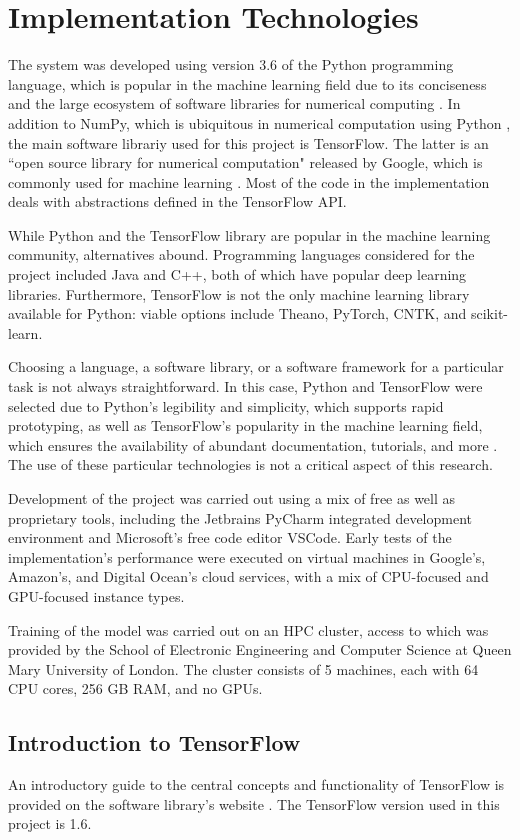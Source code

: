\documentclass[12pt, titlepage]{report}
\theoremstyle{definition}
\begin{document}
\section{Implementation Technologies}
The system was developed using version 3.6 of the Python programming language, which is popular in the machine learning field due to its conciseness and the large ecosystem of software libraries for numerical computing \cite{numpy}. In addition to NumPy, which is ubiquitous in numerical computation using Python \cite{numpy}, the main software librariy used for this project is TensorFlow. The latter is an ``open source library for numerical computation" released by Google, which is commonly used for machine learning \cite{tensorflow}. Most of the code in the implementation deals with abstractions defined in the TensorFlow API.

While Python and the TensorFlow library are popular in the machine learning community, alternatives abound. Programming languages considered for the project included Java and C++, both of which have popular deep learning libraries. Furthermore, TensorFlow is not the only machine learning library available for Python: viable options include Theano, PyTorch, CNTK, and scikit-learn.

Choosing a language, a software library, or a software framework for a particular task is not always straightforward. In this case, Python and TensorFlow were selected due to Python's legibility and simplicity, which supports rapid prototyping, as well as TensorFlow's popularity in the machine learning field, which ensures the availability of abundant documentation, tutorials, and more \cite{bhatia2017why}. The use of these particular technologies is not a critical aspect of this research.

Development of the project was carried out using a mix of free as well as proprietary tools, including the Jetbrains PyCharm integrated development environment and Microsoft's free code editor VSCode. Early tests of the implementation's performance were executed on virtual machines in Google's, Amazon's, and Digital Ocean's cloud services, with a mix of CPU-focused and GPU-focused instance types.

Training of the model was carried out on an HPC cluster, access to which was provided by the School of Electronic Engineering and Computer Science at Queen Mary University of London. The cluster consists of 5 machines, each with 64 CPU cores, 256 GB RAM, and no GPUs.


\subsection{Introduction to TensorFlow}
An introductory guide to the central concepts and functionality of TensorFlow is provided on the software library's website \cite{tensorflow2018intro}. The TensorFlow version used in this project is 1.6.
\end{document}
